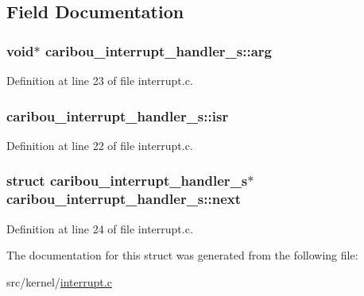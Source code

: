 \subsection{Field Documentation}
\hypertarget{structcaribou__interrupt__handler__s_aefaec04418af509f17589f6e3ed6ff0e}{
\subsubsection[{arg}]{\setlength{\rightskip}{0pt plus 5cm}void$\ast$ caribou\-\_\-interrupt\-\_\-handler\-\_\-s\-::arg}}\label{structcaribou__interrupt__handler__s_aefaec04418af509f17589f6e3ed6ff0e}


Definition at line 23 of file interrupt.\-c.

\hypertarget{structcaribou__interrupt__handler__s_aecb54a9629094e45d0de339021c6a1a0}{
\subsubsection[{isr}]{ caribou\-\_\-interrupt\-\_\-handler\-\_\-s\-::isr}}\label{structcaribou__interrupt__handler__s_aecb54a9629094e45d0de339021c6a1a0}


Definition at line 22 of file interrupt.\-c.

\hypertarget{structcaribou__interrupt__handler__s_a0d58e1ee1f99080457360177c803b034}{
\subsubsection[{next}]{\setlength{\rightskip}{0pt plus 5cm}struct {\bf caribou\-\_\-interrupt\-\_\-handler\-\_\-s}$\ast$ caribou\-\_\-interrupt\-\_\-handler\-\_\-s\-::next}}\label{structcaribou__interrupt__handler__s_a0d58e1ee1f99080457360177c803b034}


Definition at line 24 of file interrupt.\-c.



The documentation for this struct was generated from the following file\-:\begin{DoxyCompactItemize}
\item 
src/kernel/\hyperlink{interrupt_8c}{interrupt.\-c}\end{DoxyCompactItemize}
